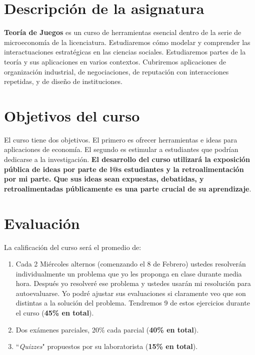 
\section*{Descripción de la asignatura}

\textbf{Teoría de Juegos} es un curso de herramientas esencial dentro de la serie de microeconomía de la licenciatura. Estudiaremos cómo modelar y comprender las interactuaciones estratégicas en las ciencias sociales. Estudiaremos partes de la teoría y sus aplicaciones en varios contextos. Cubriremos aplicaciones de organización industrial, de negociaciones, de reputación con interacciones repetidas, y de diseño de instituciones.

\section*{Objetivos del curso}

El curso tiene dos objetivos. El primero es ofrecer herramientas e ideas para aplicaciones de economía. El segundo es estimular a estudiantes que podrían dedicarse a la investigación. \textbf{El desarrollo del curso utilizará la exposición pública de ideas por parte de l@s estudiantes y la retroalimentación por mi parte. Que sus ideas sean expuestas, debatidas, y retroalimentadas públicamente es una parte crucial de su aprendizaje}.

\section*{Evaluación}

La calificación del curso será el promedio de:
\begin{enumerate}
    \item Cada 2 Miércoles alternos (comenzando el 8 de Febrero) ustedes resolverán individualmente un problema que yo les proponga en clase durante media hora. Después yo resolveré ese problema y ustedes usarán mi resolución para autoevaluarse. Yo podré ajustar sus evaluaciones si claramente veo que son distintas a la solución del problema. Tendremos 9 de estos ejercicios durante el curso (\textbf{45\% en total}).
    \item Dos exámenes parciales, 20\% cada parcial (\textbf{40\% en total}).
    \item ``\textit{Quizzes}" propuestos por su laboratorista (\textbf{15\% en total}).
\end{enumerate}

